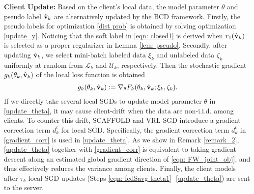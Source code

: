 \documentclass[twoside,journal]{IEEEtran}
\def\VectorFont{\bf}
\newcommand{\vv}{{\VectorFont v}}
\begin{document}
 \textbf{Client Update:} Based on the client's local data, the model parameter $\theta$ and pseudo label $\hat{\vv}_k$ are alternatively updated by the BCD framework. Firstly, the pseudo labels for optimization \eqref{dist prob} is obtained by solving  optimization \eqref{update_y}. Noticing that the soft label in \eqref{eqn: closed1}  is derived  when $r_1(\hat{\vv}_k)$ is selected as a proper regularizer in Lemma \ref{lem: pseudo}. Secondly, after updating $\hat{\vv}_k$, we select mini-batch  labeled data $\xi_k$ and unlabeled data $\zeta_k$
  uniformly at random from $\mathcal{L}_k$ and $\mathcal{U}_k$, respectively. Then the stochastic gradient $g_k(\theta_k, \hat \vv_k)$ of the local loss function is obtained
  \begin{align}
   g_k(\theta_k, \hat \vv_k):=
        \nabla_{\theta} F_k(\theta_k, \hat \vv_k ; \xi_k,\zeta_k).
  \end{align}
   If we directly take several local  SGDs to update model parameter $\theta$ in \eqref{update_theta}, it may  cause  client-drift when the data  are non-i.i.d. among clients.  To counter this drift, SCAFFOLD \cite{karimireddy2020scaffold} and VRL-SGD \cite{liang2019variance}  introduce a gradient correction term $d_k^t$ for local SGD. Specifically, the gradient correction term $d_k^t$ in \eqref{gradient_corr} is used in \eqref{update_theta}. As we show in Remark \ref{remark_2},
   \eqref{update_theta} together with \eqref{gradient_corr} is equivalent to taking gradient descent along an estimated global gradient direction of
   \eqref{eqn: FW_joint_obj}, and thus effectively reduces the variance among clients. Finally, the  client models after $\tau_k$ local SGD updates (Steps \eqref{eqn: fedSavg theta1} -\eqref{update_theta}) are sent to the server.
\end{document}
